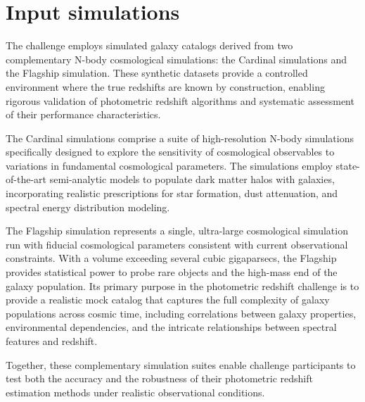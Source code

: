 \section{Input simulations}
\label{sec:input_sims}

The challenge employs simulated galaxy catalogs derived from two
complementary N-body cosmological simulations: the Cardinal
simulations and the Flagship simulation. These synthetic datasets
provide a controlled environment where the true redshifts are known by
construction, enabling rigorous validation of photometric redshift
algorithms and systematic assessment of their performance
characteristics.

The Cardinal simulations comprise a suite of high-resolution N-body
simulations specifically designed to explore the sensitivity of
cosmological observables to variations in fundamental cosmological
parameters. The simulations employ state-of-the-art semi-analytic
models to populate dark matter halos with galaxies, incorporating
realistic prescriptions for star formation, dust attenuation, and
spectral energy distribution modeling.

The Flagship simulation represents a single, ultra-large cosmological
simulation run with fiducial cosmological parameters consistent with
current observational constraints. With a volume exceeding several
cubic gigaparsecs, the Flagship provides statistical power to probe
rare objects and the high-mass end of the galaxy population. Its
primary purpose in the photometric redshift challenge is to provide a
realistic mock catalog that captures the full complexity of galaxy
populations across cosmic time, including correlations between galaxy
properties, environmental dependencies, and the intricate
relationships between spectral features and redshift.

Together, these complementary simulation suites enable challenge
participants to test both the accuracy and the robustness of their
photometric redshift estimation methods under realistic observational
conditions.
